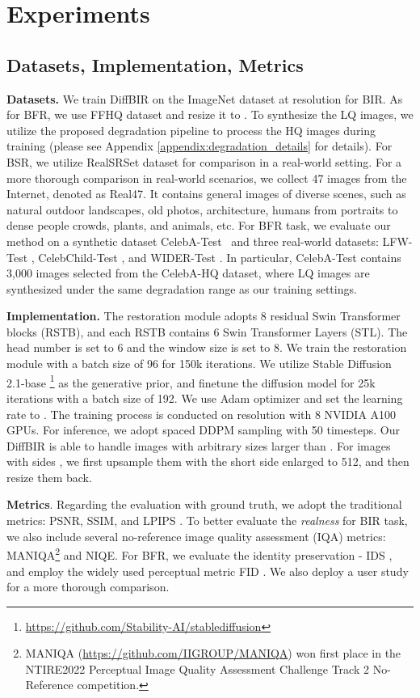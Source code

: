 \documentclass{article}
\begin{document}
\section{Experiments}

\subsection{Datasets, Implementation, Metrics}
\noindent\textbf{Datasets.}
We train DiffBIR on the ImageNet \cite{imagenet} dataset at  resolution for BIR. As for BFR, we use FFHQ \cite{stylegan1} dataset and resize it to .
To synthesize the LQ images, we utilize the proposed degradation pipeline to process the HQ images during training (please see Appendix \ref{appendix:degradation_details} for details). 
For BSR, we utilize RealSRSet \cite{cai2019toward} dataset for comparison in a real-world setting. For a more thorough comparison in real-world scenarios, we collect 47 images from the Internet, denoted as Real47. It contains general images of diverse scenes, such as natural outdoor landscapes, old photos, architecture, humans from portraits to dense people crowds, plants, and animals, etc.
For BFR task, we evaluate our method on a synthetic dataset CelebA-Test~\cite{celeba} and three real-world
datasets: LFW-Test \cite{gfpgan}, CelebChild-Test \cite{gfpgan}, and WIDER-Test \cite{codeformer}. In particular, CelebA-Test contains 3,000
images selected from the CelebA-HQ dataset, where LQ images are synthesized under the same degradation range as our training settings. 


\noindent\textbf{Implementation.}
The restoration module adopts 8 residual Swin Transformer blocks (RSTB), and each RSTB contains 6 Swin Transformer Layers (STL). The head number is set to 6 and the window size is set to 8. We train the restoration module with a batch size of 96 for 150k iterations. 
We utilize Stable Diffusion 2.1-base \footnote{\url{https://github.com/Stability-AI/stablediffusion}} as the generative prior, and finetune the diffusion model for 25k iterations with a batch size of 192.
We use Adam \cite{adam} optimizer and set the learning rate to . 
The training process is conducted on  resolution with 8
NVIDIA A100 GPUs. For inference, we adopt
spaced DDPM sampling \cite{iddpm} with 50 timesteps. 
Our DiffBIR is able to handle images with arbitrary sizes larger than .
For images with sides , we first upsample them with the short side enlarged to 512, and then resize them back.

\noindent\textbf{Metrics}. Regarding the evaluation with ground truth, we adopt the traditional metrics: PSNR, SSIM, and LPIPS \cite{lpips}.
To better evaluate the \textit{realness} for BIR task, we also include several no-reference image quality assessment (IQA) metrics: MANIQA\footnote{MANIQA (\url{https://github.com/IIGROUP/MANIQA}) won first place in the NTIRE2022 Perceptual Image Quality Assessment Challenge Track 2 No-Reference competition.} \cite{maniqa} and NIQE. For BFR, we evaluate the identity preservation - IDS \cite{codeformer}, and employ the widely used perceptual metric FID \cite{fid}.
We also deploy a user study for a more thorough comparison.
\end{document}
